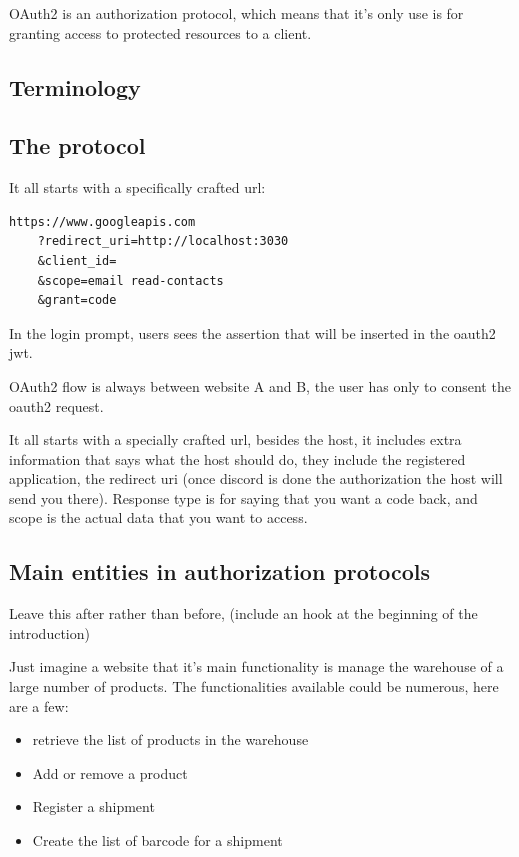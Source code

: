 \documentclass[20pt]{style}
\begin{document}
OAuth2 is an authorization protocol, which means that it's only use is for
granting access to protected resources to a client.

\subsection{Terminology}

\subsection{The protocol}
It all starts with a specifically crafted url:
\begin{lstlisting}
https://www.googleapis.com
    ?redirect_uri=http://localhost:3030
    &client_id=
    &scope=email read-contacts
    &grant=code
\end{lstlisting}

In the login prompt, users sees the assertion that will be inserted in the
oauth2 jwt.

OAuth2 flow is always between website A and B, the user has only to consent the
oauth2 request.

It all starts with a specially crafted url, besides the host, it includes extra
information that says what the host should do, they include the registered
application, the redirect uri (once discord is done the authorization the host
will send you there). Response type is for saying that you want a code back, and
scope is the actual data that you want to access.


\subsection{Main entities in authorization protocols}
Leave this after rather than before, (include an hook at the beginning of the
introduction)

Just imagine a website that it's main functionality is manage the warehouse of a
large number of products.
The functionalities available could be numerous, here are a few:

\begin{itemize}
    \item retrieve the list of products in the warehouse
    \item Add or remove a product
    \item Register a shipment
    \item Create the list of barcode for a shipment
\end{itemize}
\end{document}
